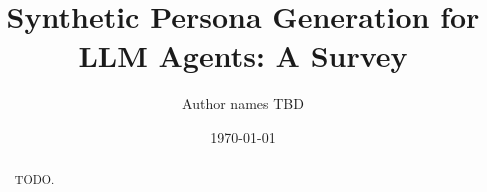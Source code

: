 \documentclass[11pt]{article}
\title{Synthetic Persona Generation for LLM Agents: A Survey}
\author{Author names TBD}
\date{\today}
\begin{document}
\maketitle

\begin{abstract}
TODO.
\end{abstract}













% 
% 
\end{document}
